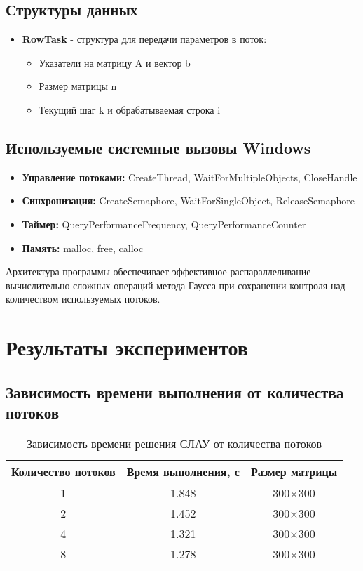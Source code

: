 \subsection{Структуры данных}
\begin{itemize}
    \item \textbf{RowTask} - структура для передачи параметров в поток:
    \begin{itemize}
        \item Указатели на матрицу A и вектор b
        \item Размер матрицы n
        \item Текущий шаг k и обрабатываемая строка i
    \end{itemize}
\end{itemize}

\subsection{Используемые системные вызовы Windows}
\begin{itemize}
    \item \textbf{Управление потоками:} CreateThread, WaitForMultipleObjects, CloseHandle
    \item \textbf{Синхронизация:} CreateSemaphore, WaitForSingleObject, ReleaseSemaphore
    \item \textbf{Таймер:} QueryPerformanceFrequency, QueryPerformanceCounter
    \item \textbf{Память:} malloc, free, calloc
\end{itemize}

Архитектура программы обеспечивает эффективное распараллеливание вычислительно сложных операций метода Гаусса при сохранении контроля над количеством используемых потоков.

\section{Результаты экспериментов}

\subsection{Зависимость времени выполнения от количества потоков}

\begin{table}[h]
\centering
\begin{tabular}{|c|c|c|}
\hline
\textbf{Количество потоков} & \textbf{Время выполнения, с} & \textbf{Размер матрицы} \\
\hline
1 & 1.848 & 300×300 \\
2 & 1.452 & 300×300 \\
4 & 1.321 & 300×300 \\
8 & 1.278 & 300×300 \\
\hline
\end{tabular}
\caption{Зависимость времени решения СЛАУ от количества потоков}
\label{tab:threads}
\end{table}

